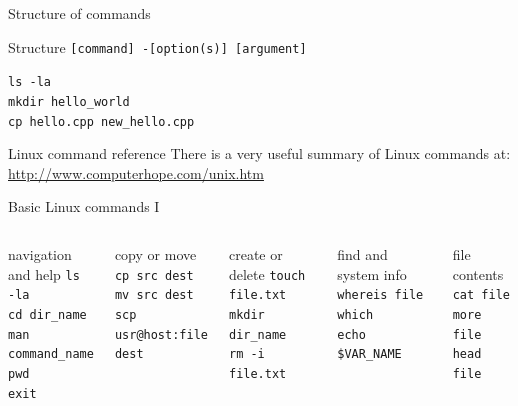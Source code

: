 \documentclass{beamer}
\begin{document}
\begin{frame}{Structure of commands}
  \begin{block}{Structure}
    \texttt{[command] -[option(s)] [argument]}
  \end{block}
  \begin{Examples}
     \texttt{ls -la \\
     mkdir hello\_world \\
     cp hello.cpp new\_hello.cpp} \\
  \end{Examples}
\end{frame}

\begin{frame}{Linux command reference}
There is a very useful summary of Linux commands at: \\
\url{http://www.computerhope.com/unix.htm}
\end{frame}


\begin{frame}{Basic Linux commands I}
  \begin{columns}
    \begin{block}{navigation and help}
      \texttt{ls -la} \\
      \texttt{cd dir\_name} \\
      \texttt{man command\_name} \\
      \texttt{pwd} \\
      \texttt{exit}
    \end{block}
    \begin{block}{copy or move}
      \texttt{cp src dest} \\
      \texttt{mv src dest} \\
      \texttt{scp usr@host:file dest}
    \end{block}

    \begin{block}{create or delete}
      \texttt{touch file.txt} \\ 
      \texttt{mkdir dir\_name} \\ 
      \texttt{rm -i file.txt}
    \end{block}
    \begin{block}{find and system info}
      \texttt{whereis file} \\
      \texttt{which} \\
      \texttt{echo \$VAR\_NAME}
    \end{block}
    \begin{block}{file contents}
      \texttt{cat file} \\
      \texttt{more file} \\
      \texttt{head file}
    \end{block}    
  \end{columns}
\end{frame}
\end{document}
